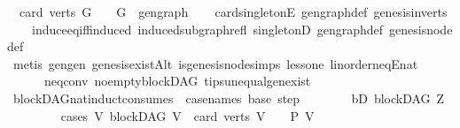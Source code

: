 \begin{isabellebody}
\ \ {\isachardoublequoteopen}card\ {\isacharparenleft}{\kern0pt}verts\ {\isacharparenleft}{\kern0pt}G{\isacharparenright}{\kern0pt}{\isacharparenright}{\kern0pt}\ {\isacharequal}{\kern0pt}\ {}\ {\isasymlongleftrightarrow}\ G\ {\isacharequal}{\kern0pt}\ gen{\isacharunderscore}{\kern0pt}graph{\isachardoublequoteclose}\isanewline
%
\isadelimproof
\ \ %
\endisadelimproof
%
\isatagproof
{}\isamarkupfalse%
\ card{\isacharunderscore}{\kern0pt}{}{\isacharunderscore}{\kern0pt}singletonE\ gen{\isacharunderscore}{\kern0pt}graph{\isacharunderscore}{\kern0pt}def\ genesis{\isacharunderscore}{\kern0pt}in{\isacharunderscore}{\kern0pt}verts\ \isanewline
\ \ \ \ induce{\isacharunderscore}{\kern0pt}eq{\isacharunderscore}{\kern0pt}iff{\isacharunderscore}{\kern0pt}induced\ induced{\isacharunderscore}{\kern0pt}subgraph{\isacharunderscore}{\kern0pt}refl\ singletonD\ gen{\isacharunderscore}{\kern0pt}graph{\isacharunderscore}{\kern0pt}def\ genesis{\isacharunderscore}{\kern0pt}node{\isacharunderscore}{\kern0pt}def\isanewline
\ \ \isamarkupfalse%
\ {\isacharparenleft}{\kern0pt}metis\ gen{\isacharunderscore}{\kern0pt}gen\ genesis{\isacharunderscore}{\kern0pt}existAlt\ is{\isacharunderscore}{\kern0pt}genesis{\isacharunderscore}{\kern0pt}node{\isachardot}{\kern0pt}simps\ less{\isacharunderscore}{\kern0pt}one\ linorder{\isacharunderscore}{\kern0pt}neqE{\isacharunderscore}{\kern0pt}nat\isanewline
\ \ \ \ \ \ neq{}{\isacharunderscore}{\kern0pt}conv\ no{\isacharunderscore}{\kern0pt}empty{\isacharunderscore}{\kern0pt}blockDAG\ tips{\isacharunderscore}{\kern0pt}unequal{\isacharunderscore}{\kern0pt}gen{\isacharunderscore}{\kern0pt}exist{\isacharparenright}{\kern0pt}%
\endisatagproof
{\isafoldproof}%
%
\isadelimproof
\ \isanewline
%
\endisadelimproof
\isanewline
{}\isamarkupfalse%
\ blockDAG{\isacharunderscore}{\kern0pt}nat{\isacharunderscore}{\kern0pt}induct{\isacharbrackleft}{\kern0pt}consumes\ {}{\isacharcomma}{\kern0pt}\ case{\isacharunderscore}{\kern0pt}names\ base\ step{\isacharbrackright}{\kern0pt}{\isacharcolon}{\kern0pt}\ \isanewline
\ \ \isanewline
\ \ \ \ bD{\isacharcolon}{\kern0pt}\ {\isachardoublequoteopen}blockDAG\ Z{\isachardoublequoteclose}\isanewline
\ \ \ \ \isanewline
\ \ \ \ cases{\isacharcolon}{\kern0pt}\ {\isachardoublequoteopen}{\isasymAnd}V{\isachardot}{\kern0pt}\ {\isacharparenleft}{\kern0pt}blockDAG\ V\ {\isasymLongrightarrow}\ card\ {\isacharparenleft}{\kern0pt}verts\ V{\isacharparenright}{\kern0pt}\ {\isacharequal}{\kern0pt}\ {}\ {\isasymLongrightarrow}\ P\ V{\isacharparenright}{\kern0pt}{\isachardoublequoteclose}\isanewline

\end{isabellebody}
